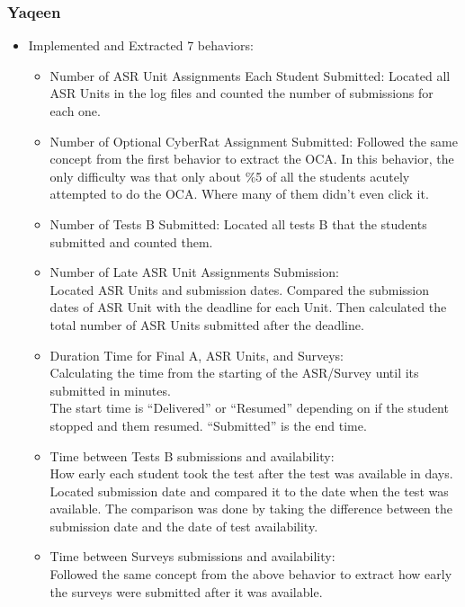 \documentclass[12pt]{article}
\begin{document}
	\subsubsection{Yaqeen}
	\begin{itemize}
		\item Implemented and Extracted 7 behaviors: 
		\begin{itemize}
			\item Number of ASR Unit Assignments Each Student Submitted: Located all ASR Units in the log files and counted the number of submissions for each one. 
			\item Number of Optional CyberRat Assignment Submitted:
Followed the same concept from the first behavior to extract the OCA. In this behavior, the only difficulty was that only about \%5 of all the students acutely attempted to do the OCA. Where many of them didn’t even click it.
\item Number of Tests B Submitted:
Located all tests B that the students submitted and counted them.
\item Number of Late ASR Unit Assignments Submission: \\
Located ASR Units and submission dates. Compared the submission dates of ASR Unit with the deadline for each Unit. Then calculated the total number of ASR Units submitted after the deadline. 
\item Duration Time for Final A, ASR Units, and Surveys: \\
	Calculating the time from the starting of the ASR/Survey until its submitted in minutes.\\ The start time is “Delivered” or “Resumed” depending on if the student stopped and them resumed. “Submitted” is the end time.  
	\item Time between Tests B submissions and availability: \\ How early each student took the test after the test was available in days. \\
Located submission date and compared it to the date when the test was available. The comparison was done by taking the difference between the submission date and the date of test availability.
	\item Time between Surveys submissions and availability: \\
		Followed the same concept from the above behavior to extract how early the surveys were submitted after it was available.\\
		\end{itemize}
	\end{itemize}
\end{document}
